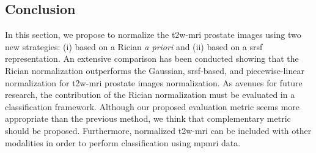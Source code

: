\subsection{Conclusion}\label{subsec:chp5:T2-norm:dis-con}
In this section, we propose to normalize the \ac{t2w}-\ac{mri} prostate images using two new strategies: (i) based on a Rician \textit{a priori} and (ii) based on a \ac{srsf} representation.
An extensive comparison has been conducted showing that the Rician normalization outperforms the Gaussian, \ac{srsf}-based, and piecewise-linear normalization for \ac{t2w}-\ac{mri} prostate images normalization.
As avenues for future research, the contribution of the Rician normalization must be evaluated in a classification framework.
Although our proposed evaluation metric seems more appropriate than the previous method, we think that complementary metric should be proposed.
Furthermore, normalized \ac{t2w}-\ac{mri} can be included with other modalities in order to perform classification using \ac{mpmri} data.